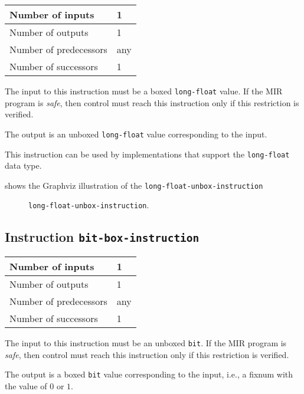 \begin{tabular}{|l|l|}
\hline
Number of inputs & 1\\
\hline
Number of outputs & 1\\
\hline
Number of predecessors & any\\
\hline
Number of successors & 1\\
\hline
\end{tabular}

The input to this instruction must be a boxed \texttt{long-float}
value.  If the MIR program is \emph{safe}, then control must reach
this instruction only if this restriction is verified.

The output is an unboxed \texttt{long-float} value corresponding to
the input.

This instruction can be used by implementations that support the
\texttt{long-float} data type.   

 shows the Graphviz illustration of the
\texttt{long-float-unbox-instruction}

\begin{figure}
\begin{center}
\end{center}
\caption{\label{fig-long-float-unbox-instruction}
\texttt{long-float-unbox-instruction}.}
\end{figure}

\subsection{Instruction \texttt{bit-box-instruction}}
\label{mir-instruction-bit-box}

\begin{tabular}{|l|l|}
\hline
Number of inputs & 1\\
\hline
Number of outputs & 1\\
\hline
Number of predecessors & any\\
\hline
Number of successors & 1\\
\hline
\end{tabular}

The input to this instruction must be an unboxed \texttt{bit}.
If the MIR program is \emph{safe}, then control must reach
this instruction only if this restriction is verified.

The output is a boxed \texttt{bit} value corresponding to the
input, i.e., a fixnum with the value of $0$ or $1$. 

